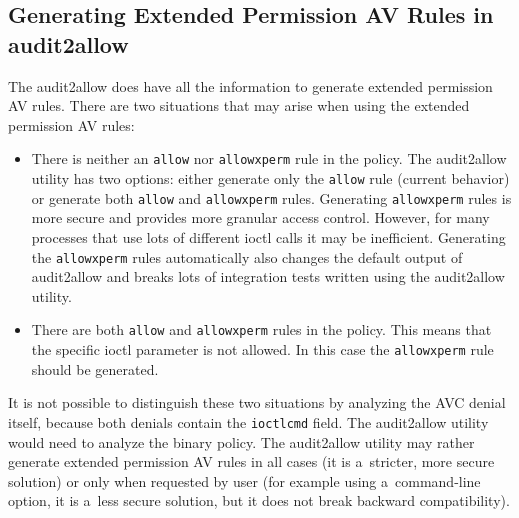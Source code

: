 \subsection{Generating Extended Permission AV Rules in audit2allow}
The audit2allow does have all the information to generate extended permission AV
rules. There are two situations that may arise when using the extended
permission AV rules:
\begin{itemize}
    \item There is neither an \texttt{allow} nor \texttt{allowxperm} rule in the
        policy. The audit2allow utility has two options: either generate only
        the \texttt{allow} rule (current behavior) or generate both
        \texttt{allow} and \texttt{allowxperm} rules. Generating
        \texttt{allowxperm} rules is more secure and provides more granular
        access control. However, for many processes that use lots of different
        ioctl calls it may be inefficient.  Generating the \texttt{allowxperm}
        rules automatically also changes the default output of audit2allow and
        breaks lots of integration tests written using the audit2allow utility.
    \item There are both \texttt{allow} and \texttt{allowxperm} rules in the
        policy. This means that the specific ioctl parameter is not allowed. In
        this case the \texttt{allowxperm} rule should be generated.
\end{itemize}

It is not possible to distinguish these two situations by analyzing the AVC
denial itself, because both denials contain the \texttt{ioctlcmd} field. The
audit2allow utility would need to analyze the binary policy. The audit2allow
utility may rather generate extended permission AV rules in all cases (it is
a~stricter, more secure solution) or only when requested by user (for example
using a~command-line option, it is a~less secure solution, but it does not break
backward compatibility).

